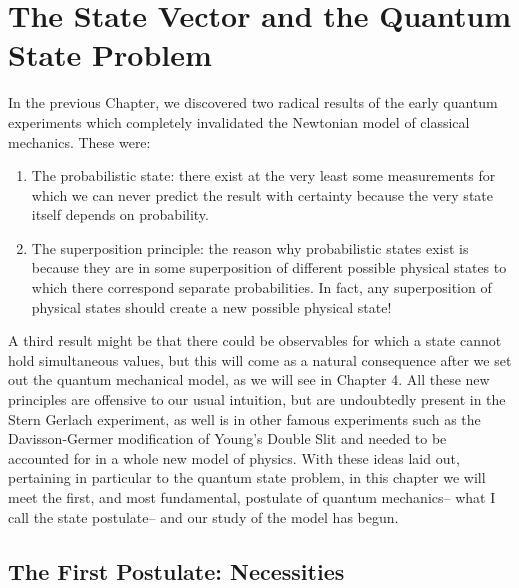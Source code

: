 \chapter{The State Vector and the Quantum State Problem}
In the previous Chapter, we discovered two radical results of the early quantum experiments which completely invalidated the Newtonian model of classical mechanics. These were:
\begin{enumerate}
    \item The probabilistic state: there exist at the very least some measurements for which we can never predict the result with certainty because the very state itself depends on probability.
    \item The superposition principle: the reason why probabilistic states exist is because they are in some superposition of different possible physical states to which there correspond separate probabilities. In fact, any superposition of physical states should create a new possible physical state!
\end{enumerate} 
A third result might be that there could be observables for which a state cannot hold simultaneous values, but this will come as a natural consequence after we set out the quantum mechanical model, as we will see in Chapter 4. All these new principles are offensive to our usual intuition, but are undoubtedly present in the Stern Gerlach experiment, as well is in other famous experiments such as the Davisson-Germer modification of Young's Double Slit and needed to be accounted for in a whole new model of physics. With these ideas laid out, pertaining in particular to the quantum state problem, in this chapter we will meet the first, and most fundamental, postulate of quantum mechanics-- what I call the state postulate-- and our study of the model has begun.
\section{The First Postulate: Necessities}
